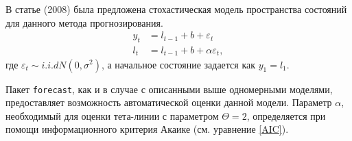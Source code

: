 В статье  (2008) была предложена стохастическая модель пространства состояний для данного метода прогнозирования. 
\begin{align*}
y_t &= l_{t-1} + b + \varepsilon_t\\
l_t &= l_{t-1} + b + \alpha\varepsilon_t,
\end{align*}
где $\varepsilon_t \sim i.i.d N(0, \sigma^2)$, а начальное состояние задается как $y_1 = l_1$.

Пакет \texttt{forecast}, как и в случае с описанными выше одномерными моделями, предоставляет возможность автоматической оценки данной модели. Параметр $\alpha$, необходимый для оценки тета-линии с параметром $\Theta = 2$, определяется при помощи информационного критерия Акаике (см. уравнение \eqref{AIC}).

